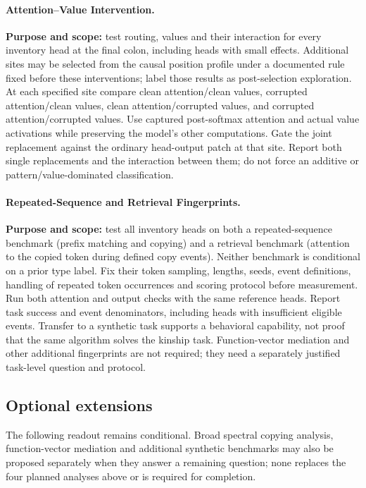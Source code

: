 \documentclass[11pt,a4paper]{article}
\begin{document}
\paragraph{Attention--Value Intervention.}
\textbf{Purpose and scope:} test routing, values and their interaction for every
inventory head at the final colon, including heads with small effects. Additional
sites may be selected from the causal position profile under a documented rule
fixed before these interventions; label those results as post-selection exploration.
At each specified site compare clean attention/clean values, corrupted attention/clean
values, clean attention/corrupted values, and corrupted attention/corrupted values.
Use captured post-softmax attention and actual value activations while preserving
the model's other computations. Gate the joint replacement against the ordinary
head-output patch at that site. Report both single replacements and the interaction
between them; do not force an additive or pattern/value-dominated classification.

\paragraph{Repeated-Sequence and Retrieval Fingerprints.}
\textbf{Purpose and scope:} test all inventory heads on both a repeated-sequence
benchmark (prefix matching and copying) and a retrieval benchmark (attention to
the copied token during defined copy events). Neither benchmark is conditional
on a prior type label. Fix their token sampling, lengths, seeds, event definitions,
handling of repeated token occurrences and scoring protocol before measurement.
Run both attention and output checks with the same reference heads. Report task
success and event denominators, including heads with insufficient eligible events.
Transfer to a synthetic task
supports a behavioral capability, not proof that the same algorithm solves the
kinship task. Function-vector mediation and other additional fingerprints are not
required; they need a separately justified task-level question and protocol.

\subsection{Optional extensions}
The following readout remains conditional. Broad spectral copying analysis,
function-vector mediation and additional synthetic benchmarks may also be proposed
separately when they answer a remaining question; none replaces the four planned
analyses above or is required for completion.
\end{document}
